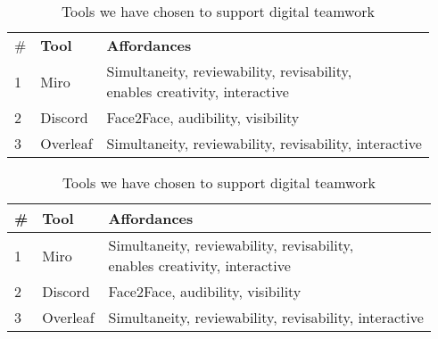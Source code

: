 \documentclass{article}
\begin{document}
\begin{table}[H]
    \caption{Tools we have chosen to support digital teamwork}
    \label{tab:cooptools}
    \vspace{1mm}
    \centering
    \begin{tabular}{|l|l|l|}
        \hline
        \#  & \textbf{Tool} & \textbf{Affordances}\\ \Xhline{2\arrayrulewidth} %
        1   & Miro          & \makecell[l]{Simultaneity, reviewability, revisability, \\enables creativity, interactive}\\\hline
        2   & Discord       & Face2Face, audibility, visibility\\\hline
        3   & Overleaf      & Simultaneity, reviewability, revisability, interactive\\\hline
    \end{tabular}
\end{table}
\begin{table}[H]
    \caption{Tools we have chosen to support digital teamwork}
    \label{tab:cooptools2}
    \vspace{1mm}
    \centering
    \begin{tabular}{lll}
        \#  & \textbf{Tool} & \textbf{Affordances}\\\toprule %
        1   & Miro          & \makecell[l]{Simultaneity, reviewability, revisability, \\enables creativity, interactive}    \\ \hline
        2   & Discord       & Face2Face, audibility, visibility             \\ \hline
        3   & Overleaf      & Simultaneity, reviewability, revisability, interactive    \\ 
    \end{tabular}
\end{table}
\end{document}
